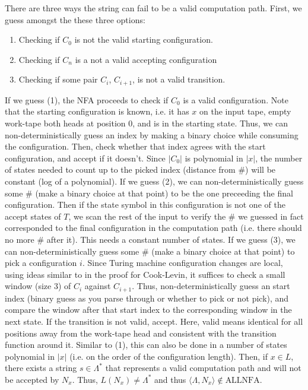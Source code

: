 \documentclass[12pt]{article}
\begin{document}
\begin{solution}
    There are three ways the string can fail to be a valid computation path. First, we guess amongst the these three options: 
    \begin{enumerate}
        \item Checking if $C_0$ is not the valid starting configuration. 
        \item Checking if $C_n$ is a not a valid accepting configuration
        \item Checking if some pair $C_i$, $C_{i+1}$, is not a valid transition.
    \end{enumerate}
    If we guess (1), the NFA proceeds to check if $C_0$ is a valid configuration. Note that the starting configuration is known, i.e. it has $x$ on the input tape, empty work-tape both heads at position $0$, and is in the starting state. Thus, we can non-deterministically guess an index by making a binary choice while consuming the configuration. Then, check whether that index agrees with the start configuration, and accept if it doesn't. Since $|C_0|$ is polynomial in $|x|$, the number of states needed to count up to the picked index (distance from \#) will be constant (log of a polynomial). \bbni
    If we guess (2), we can non-deterministically guess some \# (make a binary choice at that point) to be the one preceeding the final configuration. Then if the state symbol in this configuration is not one of the accept states of $T$, we scan the rest of the input to verify the \# we guessed in fact corresponded to the final configuration in the computation path (i.e. there should no more \# after it). This needs a constant number of states. \bbni
    If we guess (3), we can non-deterministically guess some \# (make a binary choice at that point) to pick a configuration $i$. Since Turing machine configuration changes are local, using ideas similar to in the proof for Cook-Levin, it suffices to check a small window (size 3) of $C_i$ against $C_{i+1}$. Thus, non-deterministically guess an start index (binary guess as you parse through or whether to pick or not pick), and compare the window after that start index to the corresponding window in the next state. If the transition is not valid, accept. Here, valid means identical for all positions away from the work-tape head and consistent with the transition function around it. Similar to (1), this can also be done in a number of states polynomial in $|x|$ (i.e. on the order of the configuration length). \bbni
    Then, if $x \in L$, there exists a string $s \in \Lambda^*$ that represents a valid computation path and will not be accepted by $N_x$. Thus, $L(N_x) \neq \Lambda^*$ and thus $\langle \Lambda, N_x \rangle \not \in \text{ALLNFA}$. \\

\end{solution}
\end{document}
